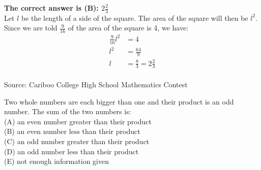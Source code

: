 \documentclass{article}
\begin{document}

\textbf{The correct answer is (B): $2\frac{2}{3}$}\\[1 ex]
Let $l$ be the length of a side of the square. The area of the square will then be $l^{2}$. Since we are told $\frac{9}{16}$ of the area of the square is 4, we have:
\begin{align*}
\frac{9}{16}l^{2} &=4\\
l^{2} &=\frac{64}{9}\\
l &=\frac{8}{3}=2\frac{2}{3}
\end{align*}
\\[5 ex]

\scriptsize
Source: Cariboo College High School Mathematics Contest

\normalsize
Two whole numbers are each bigger than one and their product is an odd number. The sum of the two numbers is:\\
(A) an even number greater than their product\\
(B) an even number less than their product\\
(C) an odd number greater than their product\\
(D) an odd number less than their product\\
(E) not enough information given\\

\end{document}
